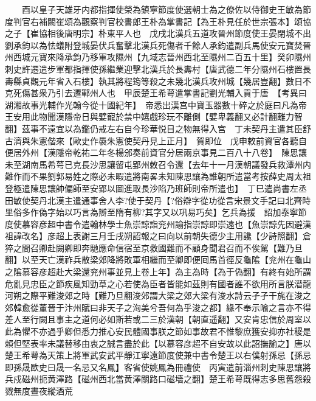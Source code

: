 　　酉以皇子天雄牙内都指揮使榮為鎮寧節度使選朝士為之僚佐以侍御史王敏為節度判官右補闕崔頌為觀察判官校書郎王朴為掌書記【為王朴見任於世宗張本】頌協之子【崔協相後唐明宗】朴東平人也　戊戌北漢兵五道攻晉州節度使王晏閉城不出劉承鈞以為怯蟻附登城晏伏兵奮擊北漢兵死傷者千餘人承鈞遣副兵馬使安元寶焚晉州西城元寶來降承鈞乃移軍攻隰州【九域志晉州西北至隰州二百五十里】癸卯隰州刺史許遷遣步軍都指揮使孫繼業迎擊北漢兵於長夀村【唐武德二年分隰州石樓置長夀縣貞觀元年省入石樓】執其將程筠等殺之未幾北漢兵攻州城【幾居豈翻】數日不克死傷甚衆乃引去遷鄆州人也　甲辰楚王希萼遣掌書記劉光輔入貢于唐　【考異曰湖湘故事光輔作光翰今從十國紀年】　帝悉出漢宫中寶玉器數十碎之於庭曰凡為帝王安用此物聞漢隱帝日與嬖寵於禁中嬉戲珍玩不離側【嬖卑義翻又必計翻離力智翻】茲事不遠宜以為鑑仍戒左右自今珍華悦目之物無得入宫　丁未契丹主遣其臣舒古濟與朱憲偕來【歐史作䮍朱憲使契丹見上正月】　賀即位　戊申敕前資官各聽自便居外州【漢隱帝乾祐二年冬楊邠奏前資官分居兩京事見二百八十八卷】　陳思讓未至湖南馬希萼已克長沙思讓留屯郢州敇召令還【去年十一月漢朝議發兵救潭州内難作而不果劉郭易姓之際必未暇遣將南畧未知陳思讓為誰朝所遣當考按薛史周太祖登極遣陳思讓帥偏師至安郢以圖進取長沙陷乃班師則帝所遣也】　丁巳遣尚書左丞田敏使契丹北漢主遣通事舍人李?使于契丹【?俗辯字從功從言宋景文手記曰北齊時里俗多作偽字始以巧言為辯至隋有柳?其字又以巩易巧矣】乞兵為援　詔加泰寧節度使慕容彦超中書令遣翰林學士魚崇諒詣兖州諭指崇諒即崇遠也【魚崇諒先因避漢祖諱改名】彦超上表謝三月壬戌朔詔報之曰向以前朝失德少主用讒【少詩照翻】倉猝之間召卿赴闕卿即奔馳應命信宿至京救國難而不顧身聞君召而不俟駕【難乃旦翻】以至天亡漢祚兵散梁郊降將敗軍相繼而至卿即便囘馬首徑反龜隂【兖州在龜山之隂慕容彦超赴大梁還兖州事並見上卷上年】為主為時【為于偽翻】有終有始所謂危亂見忠臣之節疾風知勁草之心若使為臣者皆能如茲則有國者誰不欲用所言朕潜龍河朔之際平難浚郊之時【難乃旦翻浚郊謂大梁之郊大梁有浚水詩云孑孑干旄在浚之郊韓愈從董晉于汴州賦曰非天子之洵美兮吾何為乎浚之都】緣不奉示喻之言亦不得差人至行闕且事主之道何必如斯若或二三於漢朝【朝直遥翻】又安肯忠信於周室以此為懼不亦過乎卿但悉力推心安民體國事朕之節如事故君不惟黎庶獲安抑亦社稷是賴但堅表率未議替移由衷之誠言盡於此【以慕容彦超不自安故以此詔撫諭之】唐以楚王希萼為天策上將軍武安武平靜江寧遠節度使兼中書令楚王以右僕射孫忌【孫忌即孫晟歐史曰晟一名忌又名鳳】客省使姚鳳為冊禮使　丙寅遣前淄州刺史陳思讓將兵戍磁州扼黄澤路【磁州西北當黄澤關路口磁墻之翻】楚王希萼既得志多思舊怨殺戮無度晝夜縱酒荒

